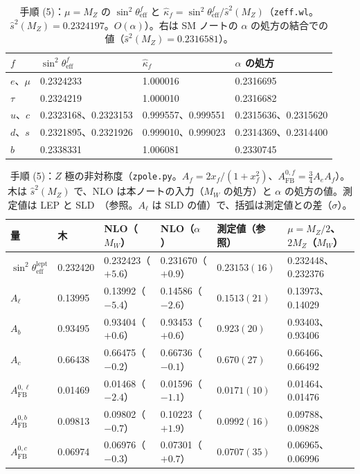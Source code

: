 \documentclass[a4paper,10pt]{ltjsarticle}
\begin{document}
\begin{table}[tbp]
\centering\small
\caption{手順 (5)：$\mu=M_Z$ の $\sin^2\theta^f_{\mathrm{eff}}$ と $\hat\kappa_f=\sin^2\theta^f_{\mathrm{eff}}/\hat s^2(M_Z)$（\texttt{zeff.wl}。$\hat s^2(M_Z)=0.2324197$。$O(\alpha)$）。右は SM ノートの $\alpha$ の処方の結合での値（$\hat s^2(M_Z)=0.2316581$）。}
\label{tab:zeff}
\begin{tabular}{lll|l}
\toprule
$f$ & $\sin^2\theta^f_{\mathrm{eff}}$ & $\hat\kappa_f$ & $\alpha$ の処方 \\
\midrule
$e$、$\mu$ & 0.2324233 & 1.000016 & 0.2316695 \\
$\tau$ & 0.2324219 & 1.000010 & 0.2316682 \\
$u$、$c$ & 0.2323168、0.2323153 & 0.999557、0.999551 & 0.2315636、0.2315620 \\
$d$、$s$ & 0.2321895、0.2321926 & 0.999010、0.999023 & 0.2314369、0.2314400 \\
$b$ & 0.2338331 & 1.006081 & 0.2330745 \\
\bottomrule
\end{tabular}
\end{table}

\begin{table}[tbp]
\centering\small
\caption{手順 (5)：$Z$ 極の非対称度（\texttt{zpole.py}。$A_f=2x_f/(1+x_f^2)$、$A^{0,f}_{\mathrm{FB}}=\frac34A_eA_f$）。木は $\hat s^2(M_Z)$ で、NLO は本ノートの入力（$M_W$ の処方）と $\alpha$ の処方の値。測定値は LEP と SLD~\cite{lepewwg06}（参照。$A_\ell$ は SLD の値）で、括弧は測定値との差（$\sigma$）。}
\label{tab:zasym}
\begin{tabular}{llllll}
\toprule
量 & 木 & NLO（$M_W$） & NLO（$\alpha$） & 測定値（参照） & $\mu=M_Z/2$、$2M_Z$（$M_W$） \\
\midrule
$\sin^2\theta^{\mathrm{lept}}_{\mathrm{eff}}$ & 0.232420 & 0.232423（$+5.6$） & 0.231670（$+0.9$） & $0.23153(16)$ & 0.232448、0.232376 \\
$A_\ell$ & 0.13995 & 0.13992（$-5.4$） & 0.14586（$-2.6$） & $0.1513(21)$ & 0.13973、0.14029 \\
$A_b$ & 0.93495 & 0.93404（$+0.6$） & 0.93453（$+0.6$） & $0.923(20)$ & 0.93403、0.93406 \\
$A_c$ & 0.66438 & 0.66475（$-0.2$） & 0.66736（$-0.1$） & $0.670(27)$ & 0.66466、0.66492 \\
$A^{0,\ell}_{\mathrm{FB}}$ & 0.01469 & 0.01468（$-2.4$） & 0.01596（$-1.1$） & $0.0171(10)$ & 0.01464、0.01476 \\
$A^{0,b}_{\mathrm{FB}}$ & 0.09813 & 0.09802（$-0.7$） & 0.10223（$+1.9$） & $0.0992(16)$ & 0.09788、0.09828 \\
$A^{0,c}_{\mathrm{FB}}$ & 0.06974 & 0.06976（$-0.3$） & 0.07301（$+0.7$） & $0.0707(35)$ & 0.06965、0.06996 \\
\bottomrule
\end{tabular}
\end{table}
\end{document}
